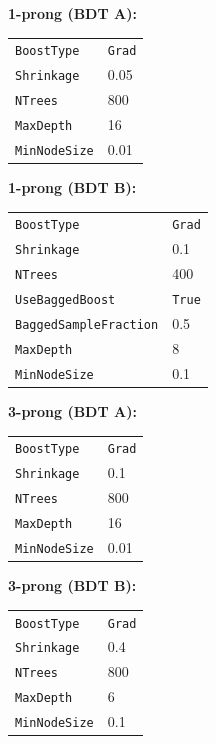 \noindent
\begin{minipage}[t]{0.5\textwidth}
\noindent\textbf{1-prong (BDT A):}\\[0.3em]
\begin{tabular}{ll}
  \texttt{BoostType} & \texttt{Grad} \\
  \texttt{Shrinkage} & 0.05 \\
  \texttt{NTrees} & 800 \\
  \texttt{MaxDepth} & 16 \\
  \texttt{MinNodeSize} & 0.01 \\
\end{tabular}

\vspace*{1em}

\noindent\textbf{1-prong (BDT B):}\\[0.3em]
\begin{tabular}{ll}
  \texttt{BoostType} & \texttt{Grad} \\
  \texttt{Shrinkage} & 0.1 \\
  \texttt{NTrees} & 400 \\
  \texttt{UseBaggedBoost} & \texttt{True} \\
  \texttt{BaggedSampleFraction} & 0.5 \\
  \texttt{MaxDepth} & 8 \\
  \texttt{MinNodeSize} & 0.1 \\
\end{tabular}
\end{minipage}%
\begin{minipage}[t]{0.5\textwidth}
\noindent\textbf{3-prong (BDT A):}\\[0.3em]
\begin{tabular}{ll}
  \texttt{BoostType} & \texttt{Grad} \\
  \texttt{Shrinkage} & 0.1 \\
  \texttt{NTrees} & 800 \\
  \texttt{MaxDepth} & 16 \\
  \texttt{MinNodeSize} & 0.01 \\
\end{tabular}

\vspace*{1em}

\noindent\textbf{3-prong (BDT B):}\\[0.3em]
\begin{tabular}{ll}
  \texttt{BoostType} & \texttt{Grad} \\
  \texttt{Shrinkage} & 0.4 \\
  \texttt{NTrees} & 800 \\
  \texttt{MaxDepth} & 6 \\
  \texttt{MinNodeSize} & 0.1 \\
\end{tabular}
\end{minipage}

